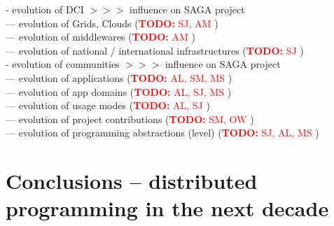 \documentclass{article}
\newcommand{\B}[1]{\textbf{#1}}
\newcommand{\nind}{\noindent}
\newcommand{\todo}[1]{{\textcolor{red}{\B{TODO:} #1 }}}
\begin{document}
    \nind
    - evolution of DCI $>>>$ influence on SAGA project\\
    --- evolution of Grids, Clouds (\todo{SJ, AM})\\
    --- evolution of middlewares (\todo{AM})\\
    --- evolution of national / international infrastructures (\todo{SJ})\\
  
    \nind
    - evolution of communities  $>>>$ influence on SAGA project\\
    --- evolution of applications (\todo{AL, SM, MS})\\
    --- evolution of app domains (\todo{AL, SJ, MS})\\
    --- evolution of usage modes (\todo{AL, SJ})\\
    --- evolution of project contributions (\todo{SM, OW})\\
    --- evolution of programming abstractions (level) (\todo{SJ, AL, MS})\\


\section{Conclusions -- distributed programming in the next decade}

\footnotesize


\end{document}
